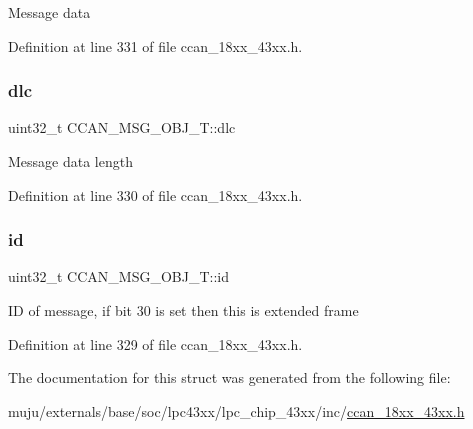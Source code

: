 Message data 

Definition at line 331 of file ccan\+\_\+18xx\+\_\+43xx.\+h.

\mbox{\label{struct_c_c_a_n___m_s_g___o_b_j___t_aab1a8e17e19a96cc7491561a2f2b9b76}} 
\subsubsection{\texorpdfstring{dlc}{dlc}}
{\footnotesize\ttfamily uint32\+\_\+t C\+C\+A\+N\+\_\+\+M\+S\+G\+\_\+\+O\+B\+J\+\_\+\+T\+::dlc}

Message data length 

Definition at line 330 of file ccan\+\_\+18xx\+\_\+43xx.\+h.

\mbox{\label{struct_c_c_a_n___m_s_g___o_b_j___t_a84856f0c1c7f3dc0cc77cabc5c944ec2}} 
\subsubsection{\texorpdfstring{id}{id}}
{\footnotesize\ttfamily uint32\+\_\+t C\+C\+A\+N\+\_\+\+M\+S\+G\+\_\+\+O\+B\+J\+\_\+\+T\+::id}

ID of message, if bit 30 is set then this is extended frame 

Definition at line 329 of file ccan\+\_\+18xx\+\_\+43xx.\+h.



The documentation for this struct was generated from the following file\+:\begin{DoxyCompactItemize}
\item 
muju/externals/base/soc/lpc43xx/lpc\+\_\+chip\+\_\+43xx/inc/\hyperlink{ccan__18xx__43xx_8h}{ccan\+\_\+18xx\+\_\+43xx.\+h}\end{DoxyCompactItemize}

